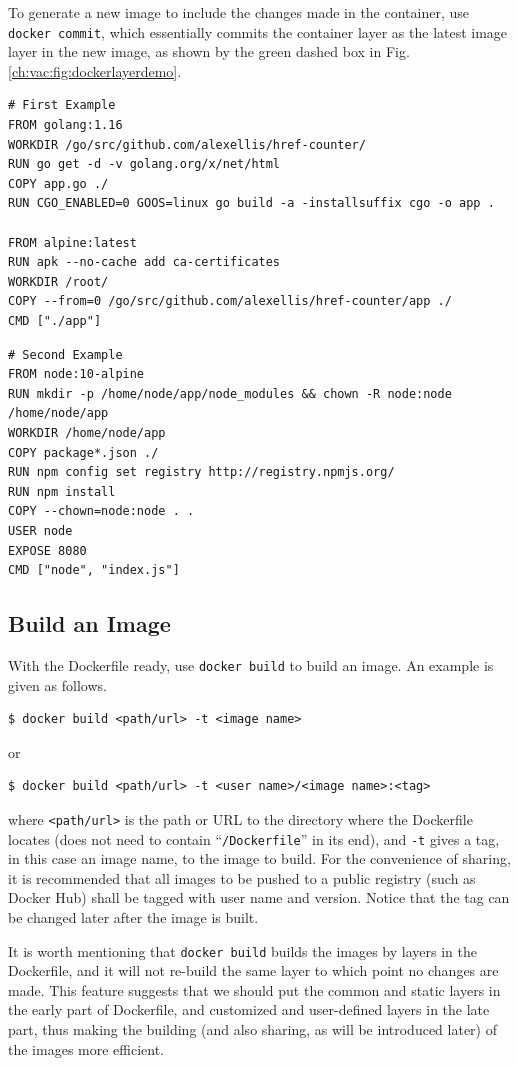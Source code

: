 To generate a new image to include the changes made in the container, use \verb|docker commit|, which essentially commits the container layer as the latest image layer in the new image, as shown by the green dashed box in Fig. \ref{ch:vac:fig:dockerlayerdemo}.

\begin{lstlisting}
# First Example
FROM golang:1.16
WORKDIR /go/src/github.com/alexellis/href-counter/
RUN go get -d -v golang.org/x/net/html
COPY app.go ./
RUN CGO_ENABLED=0 GOOS=linux go build -a -installsuffix cgo -o app .

FROM alpine:latest
RUN apk --no-cache add ca-certificates
WORKDIR /root/
COPY --from=0 /go/src/github.com/alexellis/href-counter/app ./
CMD ["./app"]
\end{lstlisting}

\begin{lstlisting}
# Second Example
FROM node:10-alpine
RUN mkdir -p /home/node/app/node_modules && chown -R node:node /home/node/app
WORKDIR /home/node/app
COPY package*.json ./
RUN npm config set registry http://registry.npmjs.org/
RUN npm install
COPY --chown=node:node . .
USER node
EXPOSE 8080
CMD ["node", "index.js"]
\end{lstlisting}

\subsection{Build an Image}

With the Dockerfile ready, use \verb|docker build| to build an image. An example is given as follows.
\begin{lstlisting}
$ docker build <path/url> -t <image name>
\end{lstlisting}
or
\begin{lstlisting}
$ docker build <path/url> -t <user name>/<image name>:<tag>
\end{lstlisting}
where \verb|<path/url>| is the path or URL to the directory where the Dockerfile locates (does not need to contain ``\verb|/Dockerfile|'' in its end), and \verb|-t| gives a tag, in this case an image name, to the image to build. For the convenience of sharing, it is recommended that all images to be pushed to a public registry (such as Docker Hub) shall be tagged with user name and version. Notice that the tag can be changed later after the image is built.

It is worth mentioning that \verb|docker build| builds the images by layers in the Dockerfile, and it will not re-build the same layer to which point no changes are made. This feature suggests that we should put the common and static layers in the early part of Dockerfile, and customized and user-defined layers in the late part, thus making the building (and also sharing, as will be introduced later) of the images more efficient.

